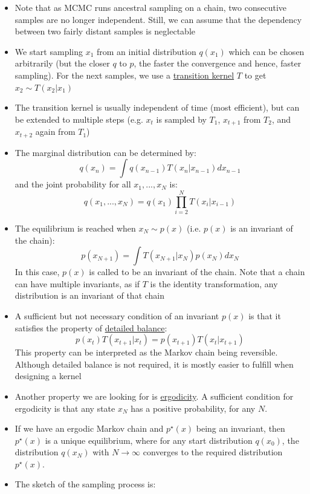 \begin{itemize}
\begin{figure}[ht!]
{			;
			;
			;
			;
			;
			;
		}
	\end{figure}
	\item Note that as MCMC runs ancestral sampling on a chain, two consecutive samples are no longer independent. Still, we can assume that the dependency between two fairly distant samples is neglectable
	\item We start sampling $x_1$ from an initial distribution $q(x_1)$ which can be chosen arbitrarily (but the closer $q$ to $p$, the faster the convergence and hence, faster sampling). For the next samples, we use a \underline{transition kernel} $T$ to get $x_2\sim T(x_2|x_1)$
	\item The transition kernel is usually independent of time (most efficient), but can be extended to multiple steps (e.g. $x_t$ is sampled by $T_1$, $x_{t+1}$ from $T_2$, and $x_{t+2}$ again from $T_1$)
	\item The marginal distribution can be determined by:
	$$q(x_{n}) = \int q(x_{n-1})T(x_{n}|x_{n-1})dx_{n-1}$$
	and the joint probability for all $x_1,...,x_N$ is:
	$$q(x_1,...,x_N) = q(x_1)\prod_{i=2}^{N}T(x_i|x_{i-1})$$
	\item The equilibrium is reached when $x_N\sim p(x)$ (i.e. $p(x)$ is an invariant of the chain):
	$$p(x_{N+1}) = \int T(x_{N+1}|x_N)p(x_N)dx_N$$ 
	In this case, $p(x)$ is called to be an invariant of the chain. Note that a chain can have multiple invariants, as if $T$ is the identity transformation, any distribution is an invariant of that chain
	\item A sufficient but not necessary condition of an invariant $p(x)$ is that it satisfies the property of \underline{detailed balance}:
	$$p(x_t)T(x_{t+1}|x_t) = p(x_{t+1})T(x_t|x_{t+1})$$
	This property can be interpreted as the Markov chain being reversible. Although detailed balance is not required, it is mostly easier to fulfill when designing a kernel
	\item Another property we are looking for is \underline{ergodicity}. A sufficient condition for ergodicity is that any state $x_N$ has a positive probability, for any $N$.
	\item If we have an ergodic Markov chain and $p^{\star}(x)$ being an invariant, then $p^{\star}(x)$ is a unique equilibrium, where for any start distribution $q(x_0)$, the distribution $q(x_N)$ with $N\to\infty$ converges to the required distribution $p^{\star}(x)$.
	\item The sketch of the sampling process is:
	

\end{itemize}
